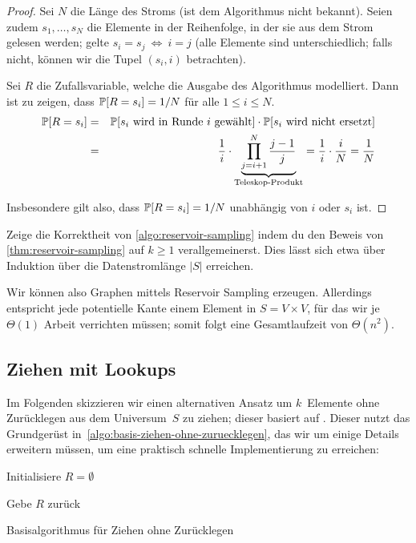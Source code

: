\begin{proof}
    Sei $N$ die Länge des Stroms (ist dem Algorithmus nicht bekannt).
    Seien zudem $s_1, \ldots, s_N$ die Elemente in der Reihenfolge, in der sie aus dem Strom gelesen werden;
    \oBdA gelte $s_i = s_j \ \Leftrightarrow\ i = j$ (\dh alle Elemente sind unterschiedlich; falls nicht, können wir die Tupel $(s_i, i)$ betrachten).

    Sei $R$ die Zufallsvariable, welche die Ausgabe des Algorithmus modelliert.
    Dann ist zu zeigen, dass $\mathbb{P}\!\left[R = s_i\right] = 1 / N$ für alle $1 \le i \le N$.
    \begin{eqnarray}
        \mathbb{P}\!\left[R = s_i\right] &=& \mathbb{P}\!\left[\text{$s_i$ wird in Runde~$i$ gewählt}\right] \cdot \mathbb{P}\!\left[\text{$s_i$ wird nicht ersetzt}\right] \\
        &=& \frac{1}{i} \cdot \underbrace{\prod_{j=i+1}^N \frac{j-1}{j}}_{\text{Teleskop-Produkt}}
        = \frac{1}{i} \cdot \frac{i}{N} = \frac{1}{N}
    \end{eqnarray}

    \noindent Insbesondere gilt also, dass $\mathbb{P}\!\left[R = s_i\right] = 1/N$ unabhängig von $i$ oder $s_i$ ist.
\end{proof}

\begin{exercise}
    Zeige die Korrektheit von \cref{algo:reservoir-sampling} indem du den Beweis von \cref{thm:reservoir-sampling} auf $k \ge 1$ verallgemeinerst.
    Dies lässt sich etwa über Induktion über die Datenstromlänge $|S|$ erreichen.
\end{exercise}

Wir können also \Gnm Graphen mittels Reservoir Sampling erzeugen.
Allerdings entspricht jede potentielle Kante einem Element in $S = V \times V$, für das wir je $\Theta(1)$ Arbeit verrichten müssen;
somit folgt eine Gesamtlaufzeit von $\Theta(n^2)$.

\subsection{Ziehen mit Lookups}
Im Folgenden skizzieren wir einen alternativen Ansatz um $k$~Elemente ohne Zurücklegen aus dem Universum~$S$ zu ziehen; dieser basiert auf \cite{batagelj2005efficient}.
Dieser nutzt das Grundgerüst in~\cref{algo:basis-ziehen-ohne-zuruecklegen}, das wir um einige Details erweitern müssen, um eine praktisch schnelle Implementierung zu erreichen:

\begin{algorithm}[H]

    Initialisiere $R = \emptyset$\;


    Gebe $R$ zurück

    \caption{Basisalgorithmus für Ziehen ohne Zurücklegen}
    \label{algo:basis-ziehen-ohne-zuruecklegen}
\end{algorithm}

